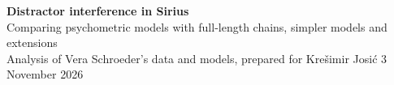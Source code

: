 




\begin{center}
{\sffamily\bfseries\LARGE Distractor interference in Sirius}\\[0.35em]
{\sffamily\large Comparing psychometric models with full-length chains, simpler models and extensions}\\[0.6em]
{\small\color{ink2} Analysis of Vera Schroeder's data and models, prepared for Kre\v{s}imir Josi\'c \textperiodcentered{} 3 November 2026}
\end{center}
\vspace{0.4em}













\appendix




